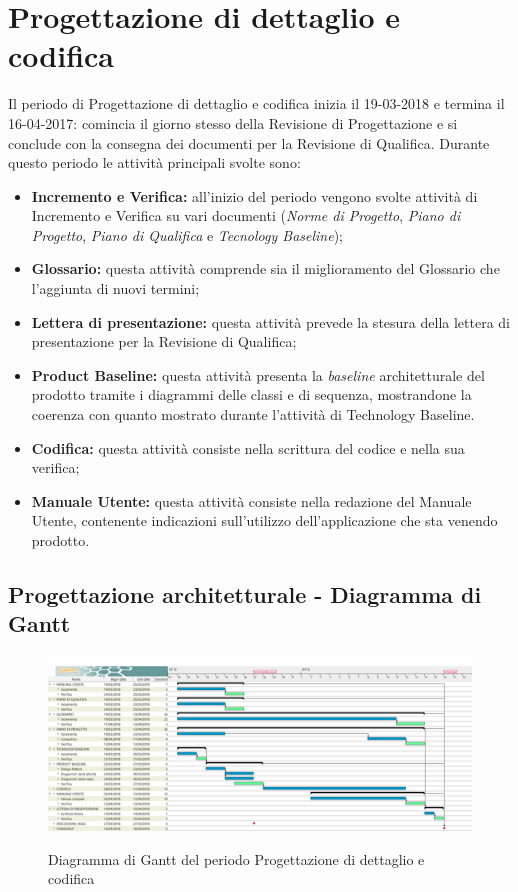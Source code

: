 \documentclass[PianoDiProgetto.tex]{subfiles}
\begin{document}
\section{Progettazione di dettaglio e codifica}
Il periodo di Progettazione di dettaglio e codifica inizia il 19-03-2018 e
termina il 16-04-2017: comincia il giorno stesso della Revisione di Progettazione e si conclude con la consegna dei documenti per la Revisione di
Qualifica. Durante questo periodo le attività principali svolte sono:


\begin{itemize}
	\item \textbf{Incremento e Verifica:} all'inizio del periodo vengono svolte attività di Incremento e Verifica su vari documenti (\textit{Norme di Progetto}, \textit{Piano di Progetto}, \textit{Piano di Qualifica} e \textit{Tecnology Baseline});
	\item \textbf{Glossario:} questa attività comprende sia il miglioramento del Glossario che l'aggiunta di nuovi termini;
	\item \textbf{Lettera di presentazione:} questa attività prevede la stesura della lettera di presentazione per la Revisione di Qualifica;
	\item \textbf{Product Baseline:} questa attività presenta la \textit{baseline} architetturale del prodotto tramite i  diagrammi delle classi e di sequenza,
	mostrandone la coerenza con quanto mostrato durante l'attività di Technology Baseline. 
	\item \textbf{Codifica:} questa attività consiste nella scrittura del codice e nella sua
	verifica;

	\item \textbf{Manuale Utente:} questa attività consiste nella redazione del
	Manuale Utente, contenente indicazioni sull’utilizzo dell'applicazione che
	sta venendo prodotto.
\end{itemize}

\begin{landscape}
	\subsection{Progettazione architetturale - Diagramma di Gantt}
	\begin{figure}[ht]
		\includegraphics[width=21cm]{images/gantt/qualifica.png}
		\label{fig:foo}
		\caption{Diagramma di Gantt del periodo Progettazione di dettaglio e
			codifica}
	\end{figure}	
\end{landscape}
\end{document}
